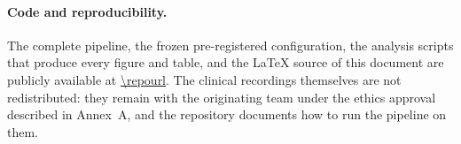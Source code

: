\paragraph{Code and reproducibility.} The complete pipeline, the frozen
pre-registered configuration, the analysis scripts that produce every figure
and table, and the \LaTeX{} source of this document are publicly available at
\url{\repourl}. The clinical recordings themselves are not redistributed:
they remain with the originating team under the ethics approval described in
Annex~A, and the repository documents how to run the pipeline on them.

